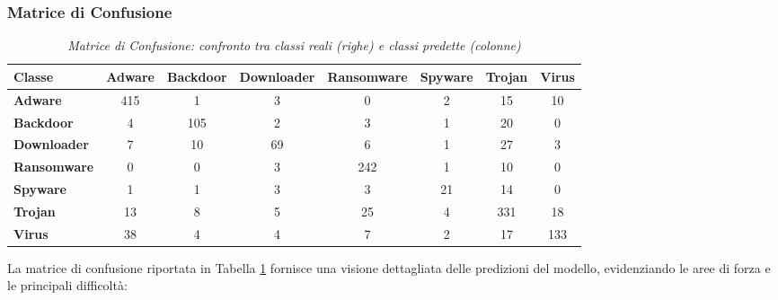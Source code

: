 \subsubsection{Matrice di Confusione}
\begin{table}[ht]
    \centering
    \hspace*{-2cm} 
    \begin{tabular}{@{}|l|c|c|c|c|c|c|c|@{}}
    \toprule
    \textbf{Classe}      & \textbf{Adware} & \textbf{Backdoor} & \textbf{Downloader} & \textbf{Ransomware} & \textbf{Spyware} & \textbf{Trojan} & \textbf{Virus} \\ \midrule
    \textbf{Adware}      & 415 & 1   & 3   & 0   & 2   & 15  & 10  \\\midrule
    \textbf{Backdoor}    & 4   & 105 & 2   & 3   & 1   & 20  & 0   \\\midrule
    \textbf{Downloader}  & 7   & 10  & 69  & 6   & 1   & 27  & 3   \\\midrule
    \textbf{Ransomware}  & 0   & 0   & 3   & 242 & 1   & 10  & 0   \\\midrule
    \textbf{Spyware}     & 1   & 1   & 3   & 3   & 21  & 14  & 0   \\\midrule
    \textbf{Trojan}      & 13  & 8   & 5   & 25  & 4   & 331 & 18  \\\midrule
    \textbf{Virus}       & 38  & 4   & 4   & 7   & 2   & 17  & 133 \\ \bottomrule
    \end{tabular}
    \vspace{.2cm}
    \caption{\emph{Matrice di Confusione: confronto tra classi reali (righe) e classi predette (colonne)}}
    \label{tab:confusion_matrix_3_esperimento}
\end{table}
La matrice di confusione riportata in Tabella \ref{tab:confusion_matrix_3_esperimento} fornisce una visione dettagliata delle predizioni del modello, evidenziando le aree di forza e le principali difficoltà:
